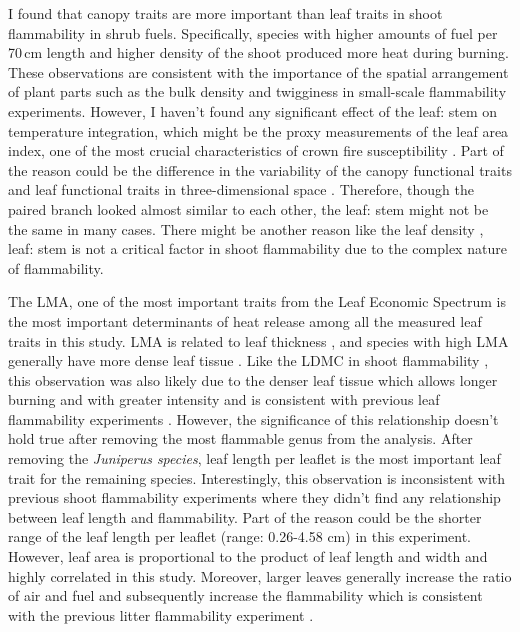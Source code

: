 \documentclass[12pt]{report}
\begin{document}
I found that canopy traits are more important than leaf traits in shoot flammability in shrub fuels.
Specifically, species with higher amounts of fuel per 70\,cm length and higher density of the shoot produced more heat during burning. These observations are consistent with the importance of the spatial arrangement of plant parts such as the bulk density \citep{pausas2012fire} and twigginess \citep{potts2022growth} in small-scale flammability experiments. However, I haven't found any significant effect of the leaf: stem on temperature integration, which might be the proxy measurements of the leaf area index, one of the most crucial characteristics of crown fire susceptibility \citep{ray2005micrometeorological}. Part of the reason could be the difference in the variability of the canopy functional traits and leaf functional traits in three-dimensional space \citep{kamoske2021leaf}. Therefore, though the paired branch looked almost similar to each other, the leaf: stem might not be the same in many cases. There might be another reason like the leaf density \citep{potts2022growth}, leaf: stem is not a critical factor in shoot flammability due to the complex nature of flammability.

The \uppercase{lma}, one of the most important traits from the Leaf Economic Spectrum \citep{wright2004worldwide} is the most important determinants of heat release among all the measured leaf traits in this study. \uppercase{lma} is related to leaf thickness \citep{niinemets1999research}, and species with high \uppercase{lma} generally have more dense leaf tissue \citep{poorter2009causes}. Like the \uppercase{ldmc} in shoot flammability \citep{alam2020shoot,potts2022growth}, this observation was also likely due to the denser leaf tissue which allows longer burning and with greater intensity and is consistent with previous leaf flammability experiments \citep{krix2018landscape}. However, the significance of this relationship doesn’t hold true after removing the most flammable genus from the analysis. After removing the \emph{Juniperus species}, leaf length per leaflet is the most important leaf trait for the remaining species. Interestingly, this observation is inconsistent with previous shoot flammability experiments \citep{alam2020shoot} where they didn’t find any relationship between leaf length and flammability. Part of the reason could be the shorter range of the leaf length per leaflet (range: 0.26-4.58 cm) in this experiment. However, leaf area is proportional to the product of leaf length and width \citep{shi2019leaf} and highly correlated in this study. Moreover, larger leaves generally increase the ratio of air and fuel and subsequently increase the flammability which is consistent with the previous litter flammability experiment \citep{scarff2006leaf,kane2008burning,de2012leaf}. 
\end{document}
